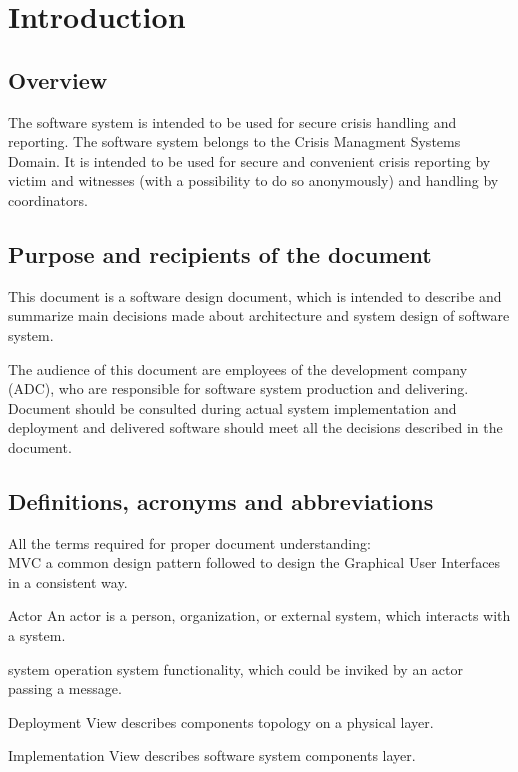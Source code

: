 \chapter{Introduction}
\label{chap:introduction}


\section{Overview}
The \mysystemname software system is intended to be used for secure crisis
handling and reporting.
The \mysystemname software system belongs to the Crisis Managment Systems
Domain. It is intended to be used for secure and convenient crisis reporting by
victim and witnesses (with a possibility to do so anonymously) and handling by
coordinators.



\section{Purpose and recipients of the document}
This document is a software design document, which is intended to describe and
summarize main decisions made about architecture and system design of
\mysystemname software system.

The audience of this document are employees of the development company (ADC),
who are responsible for \mysystemname software system production and
delivering. Document should be consulted during actual system implementation
and deployment and delivered software should meet all the decisions described in
the document.

\section{Definitions, acronyms and abbreviations}
All the terms required for proper document understanding: \\

\gls{MVC} a common design pattern followed to design the Graphical User
Interfaces in a consistent way.

\gls{Actor} An actor is a person, organization, or external system, which
interacts with a system.

\gls{system operation} system functionality, which could be inviked by an actor
passing a message.

\gls{Deployment View} describes components topology on a physical layer.

\gls{Implementation View} describes software system components layer.

